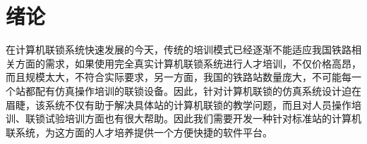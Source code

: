\section{绪论}
在计算机联锁系统快速发展的今天，传统的培训模式已经逐渐不能适应我国铁路相关方面的需求，如果使用完全真实计算机联锁系统进行人才培训，不仅价格高昂，而且规模太大，不符合实际要求，另一方面，我国的铁路站数量庞大，不可能每一个站都配有仿真操作培训的联锁设备。因此，针对计算机联锁的仿真系统设计迫在眉睫，该系统不仅有助于解决具体站的计算机联锁的教学问题，而且对人员操作培训、联锁试验培训方面也有很大帮助。因此我们需要开发一种针对标准站的计算机联系统，为这方面的人才培养提供一个方便快捷的软件平台。